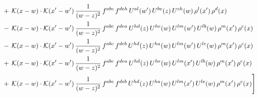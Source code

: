 \documentclass[9pt]{article}
\numberwithin{equation}{section}
\begin{document}
\begin{align}
&+\,\mathcal{K}(x-w)\cdot\mathcal{K}(x'-w')\,\frac{1}{(w-z)^{2}}\,f^{abc}\,f^{deh}\,U^{al}(w')\,U^{be}(z)\,U^{ch}(w)\,\rho^{l}(x')\,\rho^{d}(x)\notag\\
&-\,\mathcal{K}(x-w)\cdot\mathcal{K}(x'-w')\,\frac{1}{(w-z)^{2}}\,f^{abc}\,f^{dea}\,U^{hd}(z)\,U^{he}(w)\,U^{lm}(w')\,U^{lb}(w)\,\rho^{m}(x')\,\rho^{c}(x)\notag\\
&-\,\mathcal{K}(x-w)\cdot\mathcal{K}(x'-w')\,\frac{1}{(w-z)^{2}}\,f^{abc}\,f^{deb}\,U^{hd}(z)\,U^{ha}(w)\,U^{lm}(w')\,U^{le}(w)\,\rho^{m}(x')\,\rho^{c}(x)\notag\\
&+\,\mathcal{K}(x-w)\cdot\mathcal{K}(x'-w')\,\frac{1}{(w-z)^{2}}\,f^{abc}\,f^{dea}\,U^{hd}(z)\,U^{he}(w)\,U^{lm}(x')\,U^{lb}(w)\,\rho^{m}(x')\,\rho^{c}(x)\notag\\
&+\,\mathcal{K}(x-w)\cdot\mathcal{K}(x'-w')\,\frac{1}{(w-z)^{2}}\,f^{abc}\,f^{deb}\,U^{hd}(z)\,U^{ha}(w)\,U^{lm}(x')\,U^{le}(w)\,\rho^{m}(x')\,\rho^{c}(x)\Bigg]
\end{align}
\end{document}
